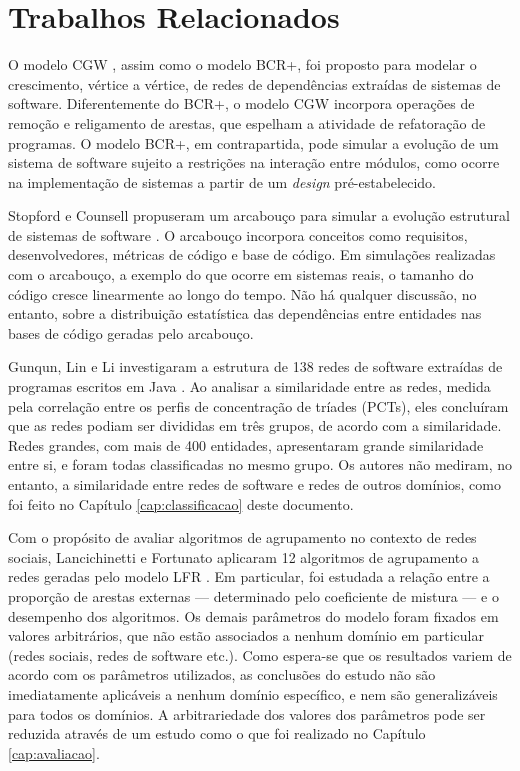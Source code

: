 \chapter{Trabalhos Relacionados} \label{cap:trabrel}

O modelo CGW \cite{Chen2008}, assim como o modelo BCR+, foi proposto para modelar o crescimento, vértice a vértice, de redes de dependências extraídas de sistemas de software. Diferentemente do BCR+, o modelo CGW incorpora operações de remoção e religamento de arestas, que espelham a atividade de refatoração de programas. O modelo BCR+, em contrapartida, pode simular a evolução de um sistema de software sujeito a restrições na interação entre módulos, como ocorre na implementação de sistemas a partir de um \emph{design} pré-estabelecido.

Stopford e Counsell propuseram um arcabouço para simular a evolução estrutural de sistemas de software \cite{Stopford2008}. O arcabouço incorpora conceitos como requisitos, desenvolvedores, métricas de código e base de código. Em simulações realizadas com o arcabouço, a exemplo do que ocorre em sistemas reais, o tamanho do código cresce linearmente ao longo do tempo. Não há qualquer discussão, no entanto, sobre a distribuição estatística das dependências entre entidades nas bases de código geradas pelo arcabouço.

Gunqun, Lin e Li investigaram a estrutura de 138 redes de software extraídas de programas escritos em Java \cite{Gunqun2008}. Ao analisar a similaridade entre as redes, medida pela correlação entre os perfis de concentração de tríades (PCTs), eles concluíram que as redes podiam ser divididas em três grupos, de acordo com a similaridade. Redes grandes, com mais de 400 entidades, apresentaram grande similaridade entre si, e foram todas classificadas no mesmo grupo. Os autores não mediram, no entanto, a similaridade entre redes de software e redes de outros domínios, como foi feito no Capítulo \ref{cap:classificacao} deste documento.

Com o propósito de avaliar algoritmos de agrupamento no contexto de redes sociais, Lancichinetti e Fortunato aplicaram 12 algoritmos de agrupamento a redes geradas pelo modelo LFR \cite{Lancichinetti2009b}. Em particular, foi estudada a relação entre a proporção de arestas externas --- determinado pelo coeficiente de mistura --- e o desempenho dos algoritmos. Os demais parâmetros do modelo foram fixados em valores arbitrários, que não estão associados a nenhum domínio em particular (redes sociais, redes de software etc.). Como espera-se que os resultados variem de acordo com os parâmetros utilizados, as conclusões do estudo não são imediatamente aplicáveis a nenhum domínio específico, e nem são generalizáveis para todos os domínios. A arbitrariedade dos valores dos parâmetros pode ser reduzida através de um estudo como o que foi realizado no Capítulo \ref{cap:avaliacao}.

